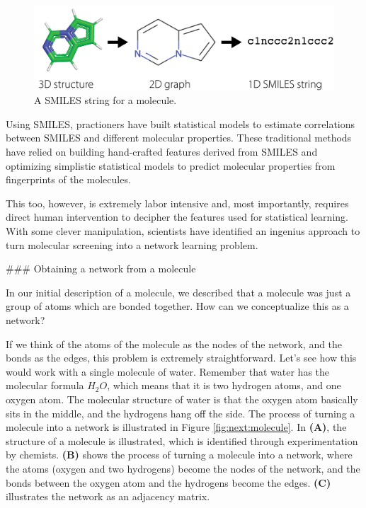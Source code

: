 \begin{figure}
    \centering
    \includegraphics[width=\linewidth]{next/Images/molecule_repr.png}
    \caption[SMILES string for a molecule]{A SMILES string for a molecule.}
    \label{fig:next:smiles}
\end{figure}

Using SMILES, practioners have built statistical models to estimate correlations between SMILES and different molecular properties. These traditional methods have relied on building hand-crafted features derived from SMILES and optimizing simplistic statistical models to predict molecular properties from fingerprints of the molecules. 

This too, however, is extremely labor intensive and, most importantly, requires direct human intervention to decipher the features used for statistical learning. With some clever manipulation, scientists have identified an ingenius approach to turn molecular screening into a network learning problem.

### Obtaining a network from a molecule

In our initial description of a molecule, we described that a molecule was just a group of atoms which are bonded together. How can we conceptualize this as a network?

If we think of the atoms of the molecule as the nodes of the network, and the bonds as the edges, this problem is extremely straightforward. Let's see how this would work with a single molecule of water. Remember that water has the molecular formula $H_2O$, which means that it is two hydrogen atoms, and one oxygen atom. The molecular structure of water is that the oxygen atom basically sits in the middle, and the hydrogens hang off the side. The process of turning a molecule into a network is illustrated in Figure \ref{fig:next:molecule}. In \textbf{(A)}, the structure of a molecule is illustrated, which is identified through experimentation by chemists. \textbf{(B)} shows the process of turning a molecule into a network, where the atoms (oxygen and two hydrogens) become the nodes of the network, and the bonds between the oxygen atom and the hydrogens become the edges. \textbf{(C)} illustrates the network as an adjacency matrix.

